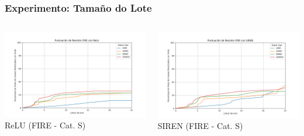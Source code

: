 \documentclass[xcolor=dvipsnames]{beamer}
\begin{document}
\begin{frame}
    \frametitle{Experimento: Tamaño do Lote}
    
    
    \begin{columns}[T]
        \begin{column}{0.5\textwidth}
            \centering
            \includegraphics[width=\textwidth]{../imaxes/batchsize/fire_registration_scores_bs_relu_S.png}
                        \small{ReLU (FIRE - Cat. S)}

        \end{column}
        \begin{column}{0.5\textwidth}
            \centering
            \includegraphics[width=\textwidth]{../imaxes/batchsize/fire_registration_scores_bs_siren_S.png}
                   \small{SIREN (FIRE - Cat. S)}
        \end{column}
    \end{columns}
    

\end{frame}
\end{document}

